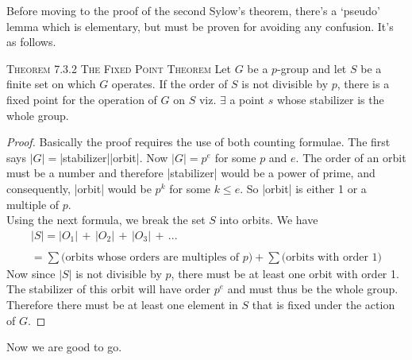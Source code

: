 \documentclass[12pt]{article}
\begin{document}
Before moving to the proof of the second Sylow's theorem, there's a `pseudo' lemma which is elementary, but must be proven for avoiding any confusion. It's as follows.
\par
\textsc {{\small Theorem 7.3.2} The Fixed Point Theorem } Let $G$ be a $p$-group and let $S$ be a finite set on which $G$ operates. If the order of $S$ is not divisible by $p$, there is a fixed point for the operation of $G$ on $S$ viz. $\exists$ a point $s$ whose stabilizer is the whole group.
\begin{proof}
Basically the proof requires the use of both counting formulae. The first says $|G|=$|stabilizer||orbit|. Now $|G|=p^{e}$ for some $p$ and $e$. The order of an orbit must be a number and therefore |stabilizer| would be a power of prime, and consequently, |orbit| would be $p^{k}$ for some $k\leq e$. So |orbit| is either 1 or a multiple of $p$.\\
Using the next formula, we break the set $S$ into orbits. We have
\begin{equation*}
\begin{array}{c}
|S|=|O_{1}|\,+\,|O_{2}|\,+\,|O_{3}|\,+\,...\\
\\
=\sum{\text{(orbits whose orders are multiples of }p)} + \sum{\text{(orbits with order 1)}}
\end{array}
\end{equation*}
Now since $|S|$ is not divisible by $p$, there must be at least one orbit with order 1. The stabilizer of this orbit will have order $p^{e}$ and must thus be the whole group. Therefore there must be at least one element in $S$ that is fixed under the action of $G$.
\end{proof}
Now we are good to go.
\end{document}
